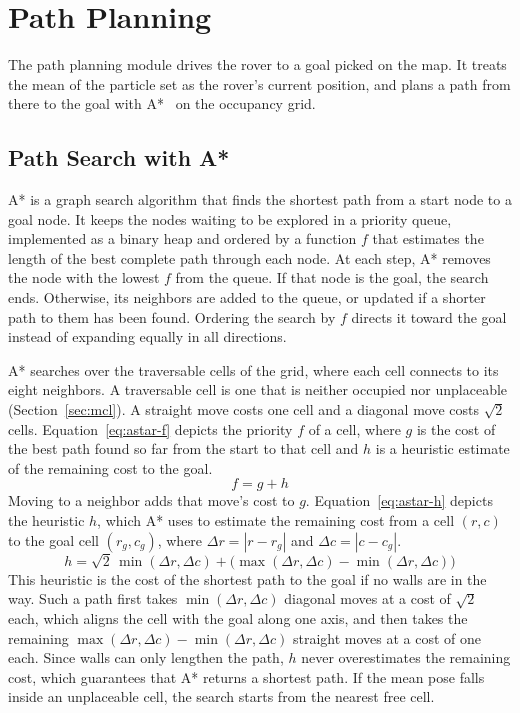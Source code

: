 \section{Path Planning}
\label{sec:navigation}



The path planning module drives the rover to a goal picked on the map. It treats the mean of
the particle set as the rover's current position, and plans a path from there to the goal
with A*~\cite{hart1968astar} on the occupancy grid.

\subsection{Path Search with A*}
\label{sec:astar-search}
A* is a graph search algorithm that finds the shortest path from a start node to a
goal node. It keeps the nodes waiting to be explored in a priority queue, implemented as a
binary heap and ordered by a function $f$ that estimates the length of the best complete path
through each node. At each step, A* removes the node with the lowest $f$ from the queue. If
that node is the goal, the search ends. Otherwise, its neighbors are added to the queue, or
updated if a shorter path to them has been found. Ordering the search by $f$ directs it toward
the goal instead of expanding equally in all directions.

A* searches over the traversable cells of the grid, where each cell connects to its eight
neighbors. A traversable cell is one that is neither occupied nor unplaceable (Section~\ref{sec:mcl}). A straight move costs
one cell and a diagonal move costs $\sqrt{2}$ cells. Equation~\ref{eq:astar-f} depicts the
priority $f$ of a cell, where $g$ is the cost of the best path found so far from the start to
that cell and $h$ is a heuristic estimate of the remaining cost to the goal.
\begin{equation}
  \label{eq:astar-f}
  f = g + h
\end{equation}
Moving to a neighbor adds that move's cost to $g$. Equation~\ref{eq:astar-h} depicts the
heuristic $h$, which A* uses to estimate the remaining cost from a cell $(r, c)$ to the goal cell
$(r_g, c_g)$, where $\Delta r = |r - r_g|$ and $\Delta c = |c - c_g|$.
\begin{equation}
  \label{eq:astar-h}
  h = \sqrt{2}\,\min(\Delta r, \Delta c) + \big(\max(\Delta r, \Delta c) - \min(\Delta r, \Delta c)\big)
\end{equation}
This heuristic is the cost of the shortest path to the goal if no
walls are in the way. Such a path first takes $\min(\Delta r, \Delta c)$ diagonal moves
at a cost of $\sqrt{2}$ each, which aligns the cell with the goal along one axis, and then takes
the remaining $\max(\Delta r, \Delta c) - \min(\Delta r, \Delta c)$ straight moves at a cost of
one each. Since walls can only lengthen the path, $h$ never overestimates
the remaining cost, which guarantees that A* returns a shortest path. If the mean pose falls
inside an unplaceable cell, the search starts from the nearest free cell.

